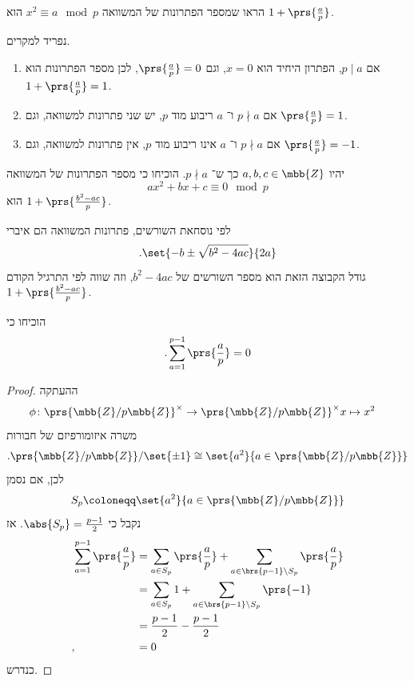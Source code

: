 \documentclass[a4paper,10pt,twoside,openany]{book}
\begin{document}
\begin{exercisechap}
הראו שמספר הפתרונות של המשוואה
$x^2 \equiv a \mod{p}$
הוא
$1 + \prs{\frac{a}{p}}$.
\end{exercisechap}

\begin{solution}
נפריד למקרים.

\begin{enumerate}
\item אם
$p \mid a$,
הפתרון היחיד הוא
$x = 0$,
וגם
$\prs{\frac{a}{p}} = 0$,
לכן מספר הפתרונות הוא
$1 + \prs{\frac{a}{p}} = 1$.

\item אם
$p \nmid a$
ו־%
$a$
ריבוע מוד
$p$,
יש שני פתרונות למשוואה, וגם
$\prs{\frac{a}{p}} = 1$.

\item אם
$p \nmid a$
ו־%
$a$
אינו ריבוע מוד
$p$,
אין פתרונות למשוואה, וגם
$\prs{\frac{a}{p}} = -1$.
\end{enumerate}
\end{solution}

\begin{exercisechap}
יהיו
$a,b,c \in \mbb{Z}$
כך ש־%
$p \nmid a$.
הוכיחו כי מספר הפתרונות של המשוואה
\[ax^2 + bx + c \equiv 0 \mod{p}\]
הוא
$1 + \prs{\frac{b^2 - ac}{p}}$.
\end{exercisechap}

\begin{solution}
לפי נוסחאת השורשים, פתרונות המשוואה הם איברי
\[\text{.} \set{-b \pm \sqrt{b^2 - 4ac}}{2a}\]
גודל הקבוצה הזאת הוא מספר השורשים של
$b^2 - 4ac$,
וזה שווה לפי התרגיל הקודם
$1 + \prs{\frac{b^2 - ac}{p}}$.
\end{solution}

\begin{exercisechap}
הוכיחו כי
\begin{align*}
\text{.} \sum_{a = 1}^{p-1} \prs{\frac{a}{p}} = 0
\end{align*}
\end{exercisechap}

\begin{proof}
ההעתקה
\begin{align*}
\phi \colon \prs{\mbb{Z}/p\mbb{Z}}^\times \to \prs{\mbb{Z}/p\mbb{Z}}^\times
x &\mapsto x^2
\end{align*}
משרה איזומורפיזם של חבורות
\begin{align*}
\text{.} \prs{\mbb{Z} / p\mbb{Z}} / \set{\pm 1} \cong \set{a^2}{a \in \prs{\mbb{Z} / p\mbb{Z}}}
\end{align*}
לכן, אם נסמן
\[S_p \coloneqq \set{a^2}{a \in \prs{\mbb{Z} / p\mbb{Z}}}\]
נקבל כי
$\abs{S_p} = \frac{p-1}{2}$.
אז
\begin{align*}
\sum_{a=1}^{p-1} \prs{\frac{a}{p}} &= \sum_{a \in S_p} \prs{\frac{a}{p}} + \sum_{a \in \brs{p-1} \setminus S_p} \prs{\frac{a}{p}}
\\&=
\sum_{a \in S_p} 1 + \sum_{a \in \brs{p-1} \setminus S_p} \prs{-1}
\\&= \frac{p-1}{2} - \frac{p-1}{2}
\\\text{,}\hphantom{\sum_{a=1}^{p-1} \prs{\frac{a}{p}}}&= 0
\end{align*}
כנדרש.
\end{proof}
\end{document}
